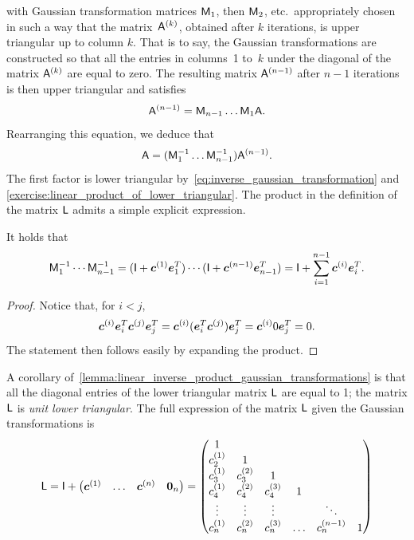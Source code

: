 with Gaussian transformation matrices $\mathsf M_1$, then $\mathsf M_2$, etc.\
appropriately chosen in such a way that the matrix~$\mathsf A^{(k)}$,
obtained after $k$ iterations,
is upper triangular up to column $k$.
That is to say, the Gaussian transformations are constructed so that
all the entries in columns~1 to~$k$ under the diagonal of the matrix $\mathsf A^{(k)}$ are equal to zero.
The resulting matrix $\mathsf A^{(n-1)}$ after $n-1$ iterations is then upper triangular
and satisfies
\[
    \mathsf A^{(n-1)} = \mathsf M_{n-1} \dotsc \mathsf M_1 \mathsf A.
\]
Rearranging this equation,
we deduce that
\[
    \mathsf A = (\mathsf M_1^{-1} \dots \mathsf M_{n-1}^{-1}) \mathsf A^{(n-1)}.
\]
The first factor is lower triangular by~\eqref{eq:inverse_gaussian_transformation} and \cref{exercise:linear_product_of_lower_triangular}.
The product in the definition of the matrix $\mathsf L$ admits a simple explicit expression.
\begin{lemma}
    \label{lemma:linear_inverse_product_gaussian_transformations}
    It holds that
    \begin{equation*}
        \mathsf M_1^{-1} \dotsb \mathsf M_{n-1}^{-1}
        = (\mathsf I + \mathbf{\boldsymbol{c}}^{(1)} \mathbf{\boldsymbol{e}}_1^T) \dotsb (\mathsf I + \mathbf{\boldsymbol{c}}^{(n-1)} \mathbf{\boldsymbol{e}}_{n-1}^T)
        = \mathsf I + \sum_{i=1}^{n-1}  \mathbf{\boldsymbol{c}}^{(i)} \mathbf{\boldsymbol{e}}_i^T.
    \end{equation*}
\end{lemma}
\begin{proof}
    Notice that, for $i < j$,
    \[
        \mathbf{\boldsymbol{c}}^{(i)} \mathbf{\boldsymbol{e}}_i^T \mathbf{\boldsymbol{c}}^{(j)} \mathbf{\boldsymbol{e}}_j^T
        = \mathbf{\boldsymbol{c}}^{(i)} (\mathbf{\boldsymbol{e}}_i^T \mathbf{\boldsymbol{c}}^{(j)}) \mathbf{\boldsymbol{e}}_j^T
        = \mathbf{\boldsymbol{c}}^{(i)} 0 \mathbf{\boldsymbol{e}}_j^T = 0.
    \]
    The statement then follows easily by expanding the product.
\end{proof}
A corollary of~\cref{lemma:linear_inverse_product_gaussian_transformations} is that all the diagonal entries of the lower triangular matrix $\mathsf L$ are equal to 1;
the matrix $\mathsf L$ is \emph{unit lower triangular}.
The full expression of the matrix $\mathsf L$ given the Gaussian transformations is
\begin{equation}
    \label{eq:linear_matrix_L}
    \mathsf L
    = \mathsf I +
    \begin{pmatrix}
        \mathbf{\boldsymbol{c}}^{(1)} & \hdots & \mathbf{\boldsymbol{c}}^{(n)} & \mathbf{\boldsymbol{0}}_n
    \end{pmatrix}
    =
    \begin{pmatrix}
        1 & \\
        c^{(1)}_2 & 1 \\
        c^{(1)}_3 & c^{(2)}_3 & 1 \\
        c^{(1)}_4 & c^{(2)}_4 & c^{(3)}_4 &  1 \\
        \vdots & \vdots & \vdots & & \ddots \\
        c^{(1)}_n & c^{(2)}_n & c^{(3)}_n & \hdots & c^{(n-1)}_n & 1 \\
    \end{pmatrix}
\end{equation}
